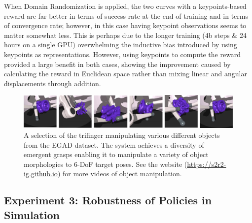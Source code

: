 \documentclass[letterpaper, 10 pt, conference]{ieeeconf}  %
\begin{document}
When Domain Randomization is applied, the two curves with a keypoints-based reward are far better in terms of success rate at the end of training and in terms of convergence rate; however, in this case having keypoint observations seems to matter somewhat less. This is perhaps due to the longer training (4b steps \& 24 hours on a single GPU) overwhelming the inductive bias introduced by using keypoints as representations. However, using keypoints to compute the reward provided a large benefit in both cases, showing the improvement caused by calculating the reward in Euclidean space rather than mixing linear and angular displacements through addition.




\begin{figure}[t]
\centering
  \includegraphics[width=0.9\linewidth]{figure/misc/grasps.pdf}  
    \caption{
       A selection of the trifinger manipulating various different objects from the EGAD dataset. The system achieves a diversity of emergent grasps enabling it to manipulate a variety of object morphologies to 6-DoF target poses. See the website (\url{https://s2r2-ig.github.io}) for more videos of object manipulation.
    }   \label{fig:different-objects}
\end{figure}

\vspace{-6pt}
\subsection{Experiment 3: Robustness of Policies in Simulation}
\vspace{-5pt}
\end{document}
